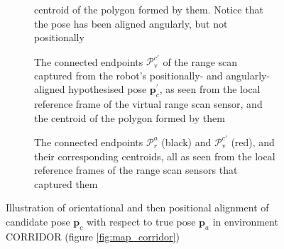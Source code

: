 \begin{figure}
\begin{subfigure}[t]{0.475\linewidth}
{                 centroid of the polygon formed by them. Notice that the pose
                 has been aligned angularly, but not positionally}
        \label{fig:pv2}
    \end{subfigure}
    \begin{subfigure}[t]{0.475\linewidth} \centering
        \hspace{0.5cm}
        \vspace{1em}
        \caption{\small The connected endpoints $\mathcal{P}_\text{v}^{c\prime}$
                 of the range scan captured from the robot's positionally- and
                 angularly-aligned hypothesised pose $\bm{p}_c^{\prime}$, as
                 seen from the local reference frame of the virtual range scan
                 sensor, and the centroid of the polygon formed by them}
        \label{fig:pv3}
    \end{subfigure}
    \hfill
    \begin{subfigure}[t]{0.475\linewidth} \centering
        \hspace{0.5cm}
        \vspace{1em}
        \caption{\small The connected endpoints $\mathcal{P}_r^a$ (black) and
                 $\mathcal{P}_\text{v}^{c\prime}$ (red), and their corresponding
                 centroids, all as seen from the local reference frames of the
                 range scan sensors that captured them}
        \label{fig:aligned}
    \end{subfigure}
    \caption{\small Illustration of orientational and then positional alignment
             of candidate pose $\bm{p}_c$ with respect to true pose $\bm{p}_a$
             in environment CORRIDOR (figure \ref{fig:map_corridor})}
    \label{fig:illustration}
\end{figure}
